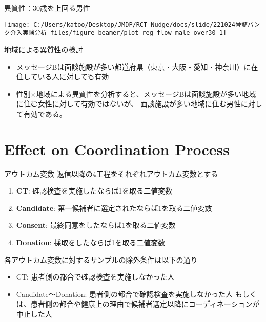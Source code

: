 \documentclass[
      aspectratio=169,
        12pt,
    ]{beamer}
\renewcommand{\textbf}[1]{{\color{DarkBlue}\bfseries#1}}
\providecommand{\tightlist}{%
  \setlength{\itemsep}{0pt}\setlength{\parskip}{0pt}}
\begin{document}
\begin{frame}{異質性：30歳を上回る男性}
\protect\hypertarget{ux7570ux8ceaux602730ux6b73ux3092ux4e0aux56deux308bux7537ux6027}{}
\begin{center}\texttt{[image: C:/Users/katoo/Desktop/JMDP/RCT-Nudge/docs/slide/221024骨髄バンク介入実験分析\_files/figure-beamer/plot-reg-flow-male-over30-1]} \end{center}
\end{frame}

\begin{frame}{地域による異質性の検討}
\protect\hypertarget{ux5730ux57dfux306bux3088ux308bux7570ux8ceaux6027ux306eux691cux8a0e}{}
\begin{itemize}
\tightlist
\item
  メッセージBは面談施設が多い都道府県（東京・大阪・愛知・神奈川）に在住している人に対しても有効
\item
  性別×地域による異質性を分析すると、メッセージBは面談施設が多い地域に住む女性に対して有効ではないが、
  面談施設が多い地域に住む男性に対して有効である。
\end{itemize}
\end{frame}

\hypertarget{effect-on-coordination-process}{%
\section{Effect on Coordination Process}\label{effect-on-coordination-process}}

\begin{frame}{アウトカム変数}
\protect\hypertarget{ux30a2ux30a6ux30c8ux30abux30e0ux5909ux6570-1}{}
返信以降の4工程をそれぞれアウトカム変数とする

\begin{enumerate}
\tightlist
\item
  \textbf{CT}: 確認検査を実施したならば1を取る二値変数
\item
  \textbf{Candidate}: 第一候補者に選定されたならば1を取る二値変数
\item
  \textbf{Consent}: 最終同意をしたならば1を取る二値変数
\item
  \textbf{Donation}: 採取をしたならば1を取る二値変数
\end{enumerate}

各アウトカム変数に対するサンプルの除外条件は以下の通り

\begin{itemize}
\tightlist
\item
  CT: 患者側の都合で確認検査を実施しなかった人
\item
  Candidate～Donation: 患者側の都合で確認検査を実施しなかった人
  もしくは、患者側の都合や健康上の理由で候補者選定以降にコーディネーションが中止した人
\end{itemize}
\end{frame}
\end{document}
